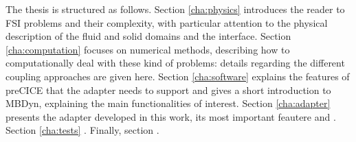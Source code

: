 
The thesis is structured as follows. Section \ref{cha:physics} introduces the reader to FSI problems and their complexity, with particular attention to the physical description of the fluid and solid domains and the interface. 
Section \ref{cha:computation} focuses on numerical methods, describing how to computationally deal with these kind of problems: details regarding the different coupling approaches are given here.
Section \ref{cha:software} explains the features of preCICE that the adapter needs to support and gives a short introduction to MBDyn, explaining the main functionalities of interest.
Section \ref{cha:adapter} presents the adapter developed in this work, its most important feautere and .
Section \ref{cha:tests} .
Finally, section .
